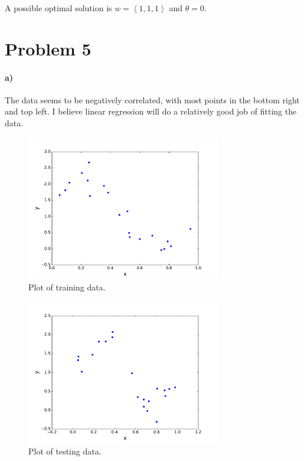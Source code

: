 \documentclass[12pt]{article}
\begin{document}
A possible optimal solution is \(w=\left<1,1,1\right>\) and \(\theta=0\).

\section*{Problem 5}

\paragraph{a)}

The data seems to be negatively correlated, with most points in the bottom right and top left. I believe
linear regression will do a relatively good job of fitting the data.

\begin{figure}[H]
        \begin{center}
                \includegraphics[height=2.5in]{trainData}
                \caption{Plot of training data.}
        \end{center}
\end{figure}

\begin{figure}[H]
        \begin{center}
                \includegraphics[height=2.5in]{testData}
                \caption{Plot of testing data.}
        \end{center}
\end{figure}
\end{document}
